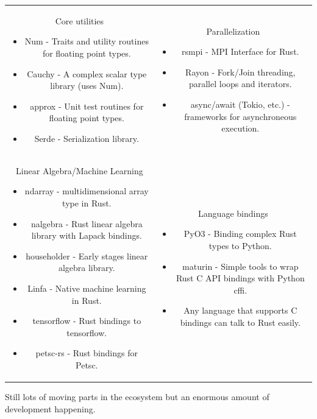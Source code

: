 \documentclass[dvipsnames,10pt]{beamer}
\begin{document}
\begin{frame}
{\begin{tabular}{cc}
\begin{minipage}[t]{5cm}
{\color{blue} Core utilities}
\begin{itemize}
\item Num - Traits and utility routines for floating point types.
\item Cauchy - A complex scalar type library (uses Num).
\item approx - Unit test routines for floating point types.
\item Serde - Serialization library.
\end{itemize}
\end{minipage} & 
\begin{minipage}[t]{5cm}
{\color{blue}Parallelization}
\begin{itemize}
\item rsmpi - MPI Interface for Rust.
\item Rayon - Fork/Join threading, parallel loops and iterators.
\item async/await (Tokio, etc.) - frameworks for asynchroneous execution.
\end{itemize}
\end{minipage}\\
\begin{minipage}[t]{5cm}
{\color{blue} Linear Algebra/Machine Learning}
\begin{itemize}
\item ndarray - multidimensional array type in Rust.
\item nalgebra - Rust linear algebra library with Lapack bindings.
\item householder - Early stages linear algebra library.
\item Linfa - Native machine learning in Rust.
\item tensorflow - Rust bindings to tensorflow.
\item petsc-rs - Rust bindings for Petsc.
\end{itemize}
\end{minipage} &
\begin{minipage}[t]{5cm}
{\color{blue} Language bindings}
\begin{itemize}
\item PyO3 - Binding complex Rust types to Python.
\item maturin - Simple tools to wrap Rust C API bindings with Python cffi.
\item Any language that supports C bindings can talk to Rust easily.
\end{itemize}
\end{minipage}

\end{tabular}

}

\vspace{\baselineskip}

\begin{tcolorbox}
Still lots of moving parts in the ecosystem but an enormous amount of development happening.
\end{tcolorbox}

\end{frame}
\end{document}

